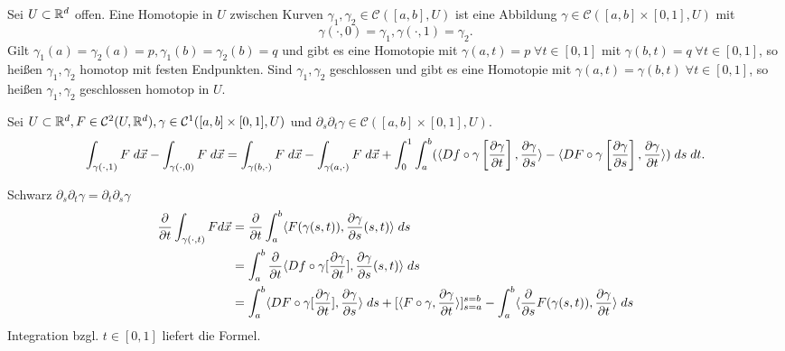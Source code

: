 \documentclass[../ana2.tex]{subfiles}
\begin{document}
\begin{defi}
    Sei \(U \subset \R^d\) offen. Eine Homotopie in \(U\)
    zwischen Kurven \(\gamma_1, \gamma_2 \in \mathcal{C}([a,b], U) \)
    ist eine Abbildung \(\gamma \in \mathcal{C}([a,b]\times [0,1], U)\) mit
    \[ \gamma(\cdot, 0) = \gamma_1, \gamma(\cdot, 1) = \gamma_2. \]
    Gilt \( \gamma_1(a) = \gamma_2(a) = p, 
    \gamma_1(b) = \gamma_2(b) = q \) und gibt es eine Homotopie mit    
    \(\gamma(a,t) = p \; \forall t \in [0,1]\) mit 
    \(\gamma(b,t) = q \; \forall t \in [0,1]\), so heißen \(\gamma_1, \gamma_2\)
    homotop mit festen Endpunkten. Sind \( \gamma_1, \gamma_2 \)
    geschlossen und gibt es eine Homotopie mit 
    \(\gamma(a, t) = \gamma(b,t) \; \forall t \in [0,1]\),
    so heißen \(\gamma_1, \gamma_2\) geschlossen homotop in \(U\).
\end{defi}
\begin{lem}
    Sei \( U \subset \R^d, F \in \mathcal{C}^2(U, \R^d), 
    \gamma \in \mathcal{C}^1([a,b] \times [0,1], U) \) und 
    \( \partial_s \partial_t \gamma \in \mathcal{C}([a,b] \times [0,1], U) \).
    \[ \int_{\gamma(\cdot, 1)} F \; d \vec{x}
    - \int_{\gamma(\cdot, 0)} F \; d\vec{x}
    = \int_{\gamma(b, \cdot)} F \; d \vec{x} 
    - \int_{\gamma(a, \cdot)} F \; d\vec{x} 
    + \int_0^1 \int_a^b (\scalarprod{Df \circ \gamma
    \left[\ddxpartialboth{\gamma}{t}\right] }{ \ddxpartialboth{\gamma}{s} } 
    - \scalarprod{ DF \circ \gamma 
    \left[\ddxpartialboth{\gamma}{s}\right] }{ \ddxpartialboth{\gamma}{t} } ) 
    \; ds\; dt. \]
\end{lem}
\begin{bew}
    Schwarz \( \partial_s \partial_t \gamma = \partial_t \partial_s \gamma \)
    \begin{align*}
        \ddxpartial{t} \int_{\gamma(\cdot, t)} F d\vec{x} 
        &= \ddxpartial{t} \integralx{\scalarprod{F(\gamma(s,t))}{\ddxpartialboth{\gamma}{s}(s,t)}}{a}{b}{s}\\
        &= \int_a^b \ddxpartial{t} \scalarprod{Df \circ \gamma[\ddxpartialboth{\gamma}{t}] }{ \ddxpartialboth{\gamma}{s}(s,t) } \; ds\\
        &= \int_a^b \scalarprod{DF \circ \gamma [\ddxpartialboth{\gamma}{t}]}{\ddxpartialboth{\gamma}{s}} \; ds + [\scalarprod{F \circ \gamma}{\ddxpartialboth{\gamma}{t}}]_{s=a}^{s=b} 
        - \int_a^b \scalarprod{ \ddxpartial{s} F(\gamma(s,t))}{\ddxpartialboth{\gamma}{t} } \; ds
    \end{align*}
    Integration bzgl. \(t \in [0,1]\) liefert die Formel.
\end{bew}
\end{document}
